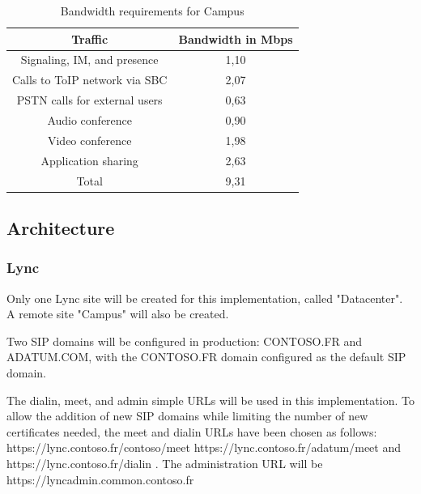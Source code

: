 		\begin{table}[H]
		\centering
		\begin{tabular}{c|c}
			\textbf{Traffic} & \textbf{Bandwidth in Mbps} \\ \hline 
			Signaling, IM, and presence & 1,10 \\
			Calls to ToIP network via SBC & 2,07 \\
			PSTN calls for external users & 0,63 \\
			Audio conference & 0,90 \\
			Video conference & 1,98 \\
			Application sharing & 2,63 \\ \hline 
			Total & 9,31
		\end{tabular}
		\caption{\label{tab:case_bandwidth} Bandwidth requirements for Campus}
		\end{table}	
		
		
		


\subsection{Architecture}

	\subsubsection{Lync}
	Only one Lync site will be created for this implementation, called "Datacenter". A remote site "Campus" will also be created.
	
	Two SIP domains will be configured in production: CONTOSO.FR and ADATUM.COM, with the CONTOSO.FR domain configured as the default SIP domain.
	
	The dialin, meet, and admin simple URLs will be used in this implementation. To allow the addition of new SIP domains while limiting the number of new certificates needed, the meet and dialin URLs have been chosen as follows: https://lync.contoso.fr/contoso/meet https://lync.contoso.fr/adatum/meet and \linebreak https://lync.contoso.fr/dialin .
	The administration URL will be \linebreak https://lyncadmin.common.contoso.fr
	
	
